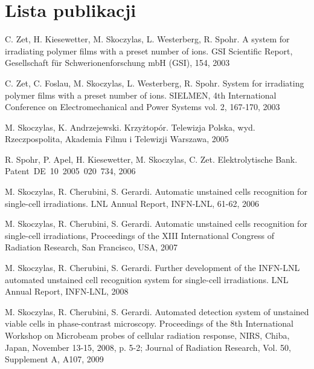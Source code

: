 \chapter*{Lista publikacji}
\thispagestyle{empty}
\pagestyle{empty}

\par
\hspace{0.6cm}C. Zet, H. Kiesewetter, M. Skoczylas, L. Westerberg, R. Spohr. A system for irradiating polymer films with a preset number of ions. GSI Scientific Report, Gesellschaft f\"ur Schwerionenforschung mbH (GSI), 154, 2003

\par
C. Zet, C. Foslau, M. Skoczylas, L. Westerberg, R. Spohr. System for irradiating polymer films with a preset number of ions. SIELMEN, 4th International Conference on Electromechanical and Power Systems  vol. 2, 167-170, 2003

\par M. Skoczylas, K. Andrzejewski. Krzyżtopór. Telewizja Polska, wyd. Rzeczpospolita, Akademia Filmu i Telewizji Warszawa, 2005

\par
R. Spohr, P. Apel, H. Kiesewetter, M. Skoczylas, C. Zet. Elektrolytische Bank. Patent~DE~10~2005~020~734, 2006

\par
M. Skoczylas, R. Cherubini, S. Gerardi. Automatic unstained cells recognition for single-cell irradiations. LNL Annual Report, INFN-LNL, 61-62, 2006

\par
M. Skoczylas, R. Cherubini, S. Gerardi. Automatic unstained cells recognition for single-cell irradiations, Proceedings of the XIII International Congress of Radiation Research, San Francisco, USA, 2007

\par
M. Skoczylas, R. Cherubini, S. Gerardi. Further development of the INFN-LNL automated unstained cell recognition system for single-cell irradiations. LNL Annual Report, INFN-LNL, 2008

\par
M. Skoczylas, R. Cherubini, S. Gerardi. Automated detection system of unstained viable cells in phase-contrast microscopy. Proceedings of the 8th International Workshop on Microbeam probes of cellular radiation response, NIRS, Chiba, Japan, November 13-15, 2008, p. 5-2; Journal of Radiation Research, Vol. 50, Supplement A, A107, 2009

